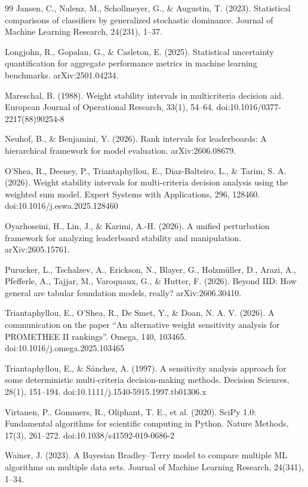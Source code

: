 \documentclass[11pt]{article}
\begin{document}
\begin{thebibliography}{99}
 Jansen, C., Nalenz, M., Schollmeyer, G., \& Augustin, T. (2023). Statistical comparisons of classifiers by generalized stochastic dominance. Journal of Machine Learning Research, 24(231), 1–37.

 Longjohn, R., Gopalan, G., \& Casleton, E. (2025). Statistical uncertainty quantification for aggregate performance metrics in machine learning benchmarks. arXiv:2501.04234.

 Mareschal, B. (1988). Weight stability intervals in multicriteria decision aid. European Journal of Operational Research, 33(1), 54–64. doi:10.1016/0377-2217(88)90254-8

 Neuhof, B., \& Benjamini, Y. (2026). Rank intervals for leaderboards: A hierarchical framework for model evaluation. arXiv:2606.08679.

 O’Shea, R., Deeney, P., Triantaphyllou, E., Diaz-Balteiro, L., \& Tarim, S. A. (2026). Weight stability intervals for multi-criteria decision analysis using the weighted sum model. Expert Systems with Applications, 296, 128460. doi:10.1016/j.eswa.2025.128460

 Oyarhoseini, H., Lin, J., \& Karimi, A.-H. (2026). A unified perturbation framework for analyzing leaderboard stability and manipulation. arXiv:2605.15761.

 Purucker, L., Tschalzev, A., Erickson, N., Blayer, G., Holzmüller, D., Arazi, A., Pfefferle, A., Tajjar, M., Varoquaux, G., \& Hutter, F. (2026). Beyond IID: How general are tabular foundation models, really? arXiv:2606.30410.

 Triantaphyllou, E., O’Shea, R., De Smet, Y., \& Doan, N. A. V. (2026). A communication on the paper “An alternative weight sensitivity analysis for PROMETHEE II rankings”. Omega, 140, 103465. doi:10.1016/j.omega.2025.103465

 Triantaphyllou, E., \& Sánchez, A. (1997). A sensitivity analysis approach for some deterministic multi-criteria decision-making methods. Decision Sciences, 28(1), 151–194. doi:10.1111/j.1540-5915.1997.tb01306.x

 Virtanen, P., Gommers, R., Oliphant, T. E., et al. (2020). SciPy 1.0: Fundamental algorithms for scientific computing in Python. Nature Methods, 17(3), 261–272. doi:10.1038/s41592-019-0686-2

 Wainer, J. (2023). A Bayesian Bradley–Terry model to compare multiple ML algorithms on multiple data sets. Journal of Machine Learning Research, 24(341), 1–34.


\end{thebibliography}
\end{document}
